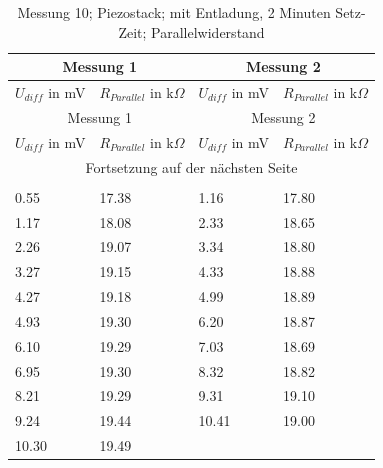 \documentclass[12pt]{scrreprt} %
\begin{document}
\begin{longtable}{| l | l | l | l |}
\hline
\multicolumn{2}{|c|}{Messung 1} &\multicolumn{2}{|c|}{Messung 2}\\
\hline
$U_{diff}$ in mV&$R_{Parallel}$ in k$\Omega$&$U_{diff}$ in mV&$R_{Parallel}$ in k$\Omega$\\
\hline
\endfirsthead
\hline
\multicolumn{2}{|c|}{Messung 1} &\multicolumn{2}{|c|}{Messung 2}\\
\hline
$U_{diff}$ in mV&$R_{Parallel}$ in k$\Omega$&$U_{diff}$ in mV&$R_{Parallel}$ in k$\Omega$\\
\hline
\endhead
\hline
\multicolumn{4}{|c|}{Fortsetzung auf der nächsten Seite}\\
\hline
\endfoot
\hline \hline
\caption[Messung 10; 2 Minuten Setz-Zeit; Piezostack; Parallelwiderstand]{Messung 10; Piezostack; mit Entladung, 2 Minuten Setz-Zeit; Parallelwiderstand}\\
\endlastfoot
\hline
\label{tab:2.10}%
0.55&17.38&1.16&17.80\\
1.17&18.08&2.33&18.65\\
2.26&19.07&3.34&18.80\\
3.27&19.15&4.33&18.88\\
4.27&19.18&4.99&18.89\\
4.93&19.30&6.20&18.87\\
6.10&19.29&7.03&18.69\\
6.95&19.30&8.32&18.82\\
8.21&19.29&9.31&19.10\\
9.24&19.44&10.41&19.00\\
10.30&19.49&&\\
\end{longtable}
\end{document}
